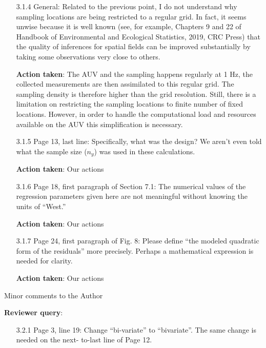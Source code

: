 \documentclass[a4paper]{article}
\def\reply{\textbf{Reviewer query}}
\def\action{\textbf{Action taken}}
\begin{document}
\begin{answers}
\begin{itemize}[noitemsep,topsep=0pt,parsep=0pt,partopsep=0pt]
\item[3.1.4] General: Related to the previous point, I do not understand why sampling locations are being restricted to a regular grid. In fact, it seems unwise because it is well known (see, for example, Chapters 9 and 22 of Handbook of Environmental and Ecological Statistics, 2019, CRC Press)
that the quality of inferences for spatial fields can be improved substantially by taking some
observations very close to others.\par
\action: The AUV and the sampling happens regularly at 1 Hz, the collected measurements are then assimilated to this regular grid. The sampling density is therefore higher than the grid resolution. Still, there is a limitation on restricting the sampling locations to finite number of fixed locations. However, in order to handle the computational load and resources available on the AUV this simplification is necessary. %
\vspace{1em}

\item[3.1.5] Page 13, last line: Specifically, what was the design? We aren’t even told what the sample size ($n_y$) was used in these calculations.\par
\action: Our actions
\vspace{1em}

\item[3.1.6] Page 18, first paragraph of Section 7.1: The numerical values of the regression parameters given here are not meaningful without knowing the units of “West.”\par
\action: Our actions
\vspace{1em}

\item[3.1.7] Page 24, first paragraph of Fig. 8: Please define “the modeled quadratic form of the residuals” more precisely. Perhaps a mathematical expression is needed for clarity.\par
\action: Our actions
\vspace{1em}

\end{itemize}


\item{Minor comments to the Author}\label{q31}

\reply: 
\begin{itemize}[noitemsep,topsep=0pt,parsep=0pt,partopsep=0pt]

\item[3.2.1] Page 3, line 19: Change “bi-variate” to “bivariate”. The same change is needed on the next-
to-last line of Page 12.


\end{itemize}
\end{answers}
\end{document}
